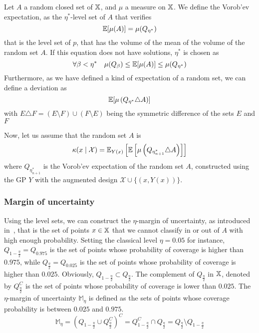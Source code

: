 \documentclass[../../Main_ManuscritThese.tex]{subfiles}
\begin{document}
\begin{definition}
  Let $A$ a random closed set of $\mathbb{X}$, and $\mu$ a measure on $\mathbb{X}$. We define the Vorob'ev expectation, as the $\eta^*$-level set of $A$ that verifies
  \begin{equation}
    \mathbb{E}[\mu(A)] = \mu(Q_{\eta^*})
  \end{equation}
  that is the level set of $p$, that has the volume of the mean of the volume of the random set $A$.
  If this equation does not have solutions, $\eta^*$ is chosen as
\begin{equation}
  \forall \beta < \eta^* \quad \mu(Q_{\beta}) \leq \mathbb{E}[\mu(A)] \leq \mu(Q_{\eta^*})
\end{equation}
Furthermore, as we have defined a kind of expectation of a random set, we can define a deviation as
\begin{equation}
  \mathbb{E}[\mu\left(Q_{\eta^*} \triangle A \right)]
\end{equation}
with $E\triangle F = \left(E \setminus F\right) \cup \left(F \setminus E\right)$ being the symmetric difference of the sets $E$ and $F$
\end{definition}


Now, let us assume that the random set $A$ is 
\begin{equation}
  \kappa(x \mid \mathcal{X}) = \mathbb{E}_{Y(x)}\left[\mathbb{E}\left[\mu\left(Q_{\eta^*_{n+1}}  \triangle A\right)\right]\right]
\end{equation}
where $Q_{\eta^*_{n+1}}$ is the Vorob'ev expectation of the random set $A$, constructed using the GP $Y$ with the augmented design $\mathcal{X}\cup\{(x, Y(x))\}$.
\subsubsection{Margin of uncertainty}
\label{sec:margin_of_uncertainty}
Using the level sets, we can construct the $\eta$-margin of uncertainty, as introduced in~\cite{dubourg_reliability-based_2011}, that is the set of points $x \in \mathbb{X}$ that we cannot classify in or out of $A$ with high enough probability.
Setting the classical level $\eta=0.05$ for instance, $Q_{1-\frac{\eta}{2}}=Q_{0.975}$ is the set of points whose probability of coverage is higher than $0.975$, while $Q_{\frac{\eta}{2}}=Q_{0.025}$ is the set of points whose probability of coverage is higher than $0.025$. Obviously, $Q_{1-\frac{\eta}{2}} \subset Q_{\frac{\eta}{2}}$. The complement of $Q_{\frac{\eta}{2}}$ in $\mathbb{X}$, denoted by $Q_{\frac{\eta}{2}}^C$ is the set of points whose probability of coverage is lower than $0.025$. The $\eta$-margin of uncertainty $\mathbb{M}_{\eta}$ is defined as the sets of points whose coverage probability is between $0.025$ and $0.975$.
\begin{equation}
  \label{eq:margin_unc}
  \mathbb{M}_{\eta} = \left(Q_{1-\frac{\eta}{2}} \cup Q^C_{\frac{\eta}{2}} \right)^C = Q_{1-\frac{\eta}{2}}^C \cap Q_{\frac{\eta}{2}} = Q_{\frac{\eta}{2}} \setminus Q_{1-\frac{\eta}{2}}
\end{equation}
\end{document}
